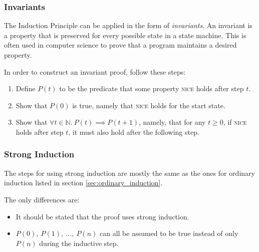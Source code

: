 \documentclass[../main.tex]{subfiles}
\begin{document}
\subsubsection{Invariants}

The Induction Principle can be applied in the form of \textit{invariants}. An invariant is a property that is preserved for every possible state in a state machine. This is often used in computer science to prove that a program maintains a desired property.

In order to construct an invariant proof, follow these steps:

\begin{enumerate}
  \item Define $P(t)$ to be the predicate that some property \textsc{nice} holds after step $t$.
  \item Show that $P(0)$ is true, namely that \textsc{nice} holds for the start state.
  \item Show that $\forall t \in \mathbb{N}.\ P(t) \implies P(t+1)$, namely, that for any $t \ge 0$, if \textsc{nice} holds after step $t$, it must also hold after the following step.
\end{enumerate}

\subsubsection{Strong Induction}

The steps for using strong induction are mostly the same as the ones for ordinary induction listed in section \ref{sec:ordinary_induction}.

The only differences are:

\begin{itemize}
  \item It should be stated that the proof uses strong induction.
  \item $P(0),\ P(1),\ ...,\ P(n)$ can all be assumed to be true instead of only $P(n)$ during the inductive step.
\end{itemize}
\end{document}
